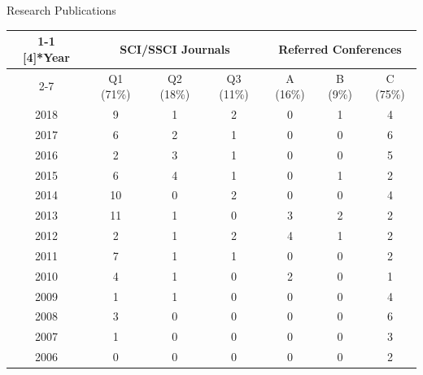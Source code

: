 \documentclass[
 size=14pt,
 paper=smartboard,  %
 mode=present, 		%
 display=slides, 	%
 style=tuliplab,  	%
 pauseslide,
 fleqn,leqno]{powerdot}{}
\begin{document}
\begin{slide}{Research Publications}
{\vspace{1cm}
\begin{table}
\fontsize{13pt}{14pt}\selectfont
    \begin{tabular}{c|c c c|c c c}
    \toprule
\cmidrule{1-1}    \multirow{2}[4]{*}{Year} & \multicolumn{3}{c|}{SCI/SSCI Journals} &
\multicolumn{3}{c}{Referred Conferences} \\
\cmidrule{2-7}          & Q1 (71\%) & Q2 (18\%) & Q3 (11\%) & A (16\%) & B (9\%) & C (75\%) \\
    \midrule
    2018  & 9     & 1     & 2     & 0     & 1     & 4 \\
    2017  & 6     & 2     & 1     & 0     & 0     & 6 \\
    2016  & 2     & 3     & 1     & 0     & 0     & 5 \\
    2015  & 6     & 4     & 1     & 0     & 1     & 2 \\
    2014  & 10    & 0     & 2     & 0     & 0     & 4 \\
    2013  & 11    & 1     & 0     & 3     & 2     & 2 \\
    2012  & 2     & 1     & 2     & 4     & 1     & 2 \\
    2011  & 7     & 1     & 1     & 0     & 0     & 2 \\
    2010  & 4     & 1     & 0     & 2     & 0     & 1 \\
    2009  & 1     & 1     & 0     & 0     & 0     & 4 \\
    2008  & 3     & 0     & 0     & 0     & 0     & 6 \\
    2007  & 1     & 0     & 0     & 0     & 0     & 3 \\
    2006  & 0     & 0     & 0     & 0     & 0     & 2 \\
    \bottomrule
    \end{tabular}
\end{table}
}

{\vspace{1.5cm}
\begin{center}
\end{center}}
\end{slide}
\end{document}
